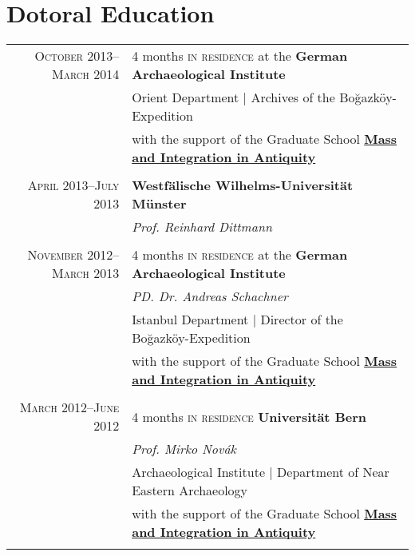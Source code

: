 \section{Dotoral Education}

 \begin{tabular}{rl}	
\textsc{October 2013--March 2014}  & 4 months  \textsc{in residence} at the \textbf{German Archaeological Institute} \\
& \small{Orient Department | Archives of the Bo\u{g}azköy-Expedition }\\ 
& \footnotesize{with the support of the Graduate School} \footnotesize{\href{http://www.fisa-miag.eu/}{\textbf{Mass and Integration in Antiquity}}} \\
&\\



\textsc{April 2013--July 2013}  &  \textbf{Westfälische Wilhelms-Universität Münster} \\
&  \emph{Prof.  Reinhard Dittmann} \\
&\\

\textsc{November 2012--March 2013}  & 4 months  \textsc{in residence} at the \textbf{German Archaeological Institute} \\
& \emph{PD. Dr. Andreas Schachner} \\
& \small{Istanbul Department | Director of the Bo\u{g}azköy-Expedition }\\ 
& \footnotesize{with the support of the Graduate School} \footnotesize{\href{http://www.fisa-miag.eu/}{\textbf{Mass and Integration in Antiquity}}} \\
&\\


\textsc{March 2012--June 2012}  & 4 months  \textsc{in residence}  \textbf{Universität Bern} \\
&  \emph{Prof. Mirko Novák} \\
& \small{Archaeological Institute | Department of Near Eastern Archaeology }\\ 
& \footnotesize{with the support of the Graduate School} \footnotesize{\href{http://www.fisa-miag.eu/}{\textbf{Mass and Integration in Antiquity}}} \\
&\\



\end{tabular}
